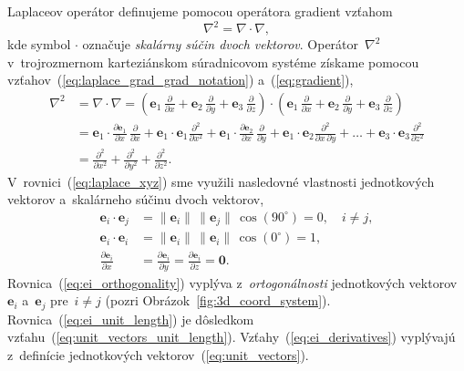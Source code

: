 \documentclass[a4paper, 12pt]{book}
\let\vec\mathbf
\begin{document}
Laplaceov operátor definujeme pomocou operátora gradient vzťahom
\parencite{SansoGeoidDetermination}
%
\begin{equation}
\label{eq:laplace_grad_grad_notation}
\nabla^2 = \nabla \cdot \nabla{,}
\end{equation}
%
kde symbol $\cdot$ označuje \emph{skalárny súčin dvoch vektorov}.  
Operátor~$\nabla^2$ v~trojrozmernom karteziánskom súradnicovom systéme získame 
pomocou vzťahov~(\ref{eq:laplace_grad_grad_notation}) a~(\ref{eq:gradient}),
%
\begin{equation}
\label{eq:laplace_xyz}
\begin{split}
\nabla^2 &= \nabla \cdot \nabla = \left( \vec e_1 \, \frac{\partial}{\partial 
x} + \vec e_2 \, \frac{\partial}{\partial y} + \vec e_3 \, 
\frac{\partial}{\partial z} \right) \cdot \left( \vec e_1 \, 
\frac{\partial}{\partial x} + \vec e_2 \, \frac{\partial}{\partial y} + \vec 
e_3 \, \frac{\partial}{\partial z} \right)\\
%
&=\vec e_1 \cdot \frac{\partial \vec e_1}{\partial x} \, 
\frac{\partial}{\partial x} + \vec e_1 \cdot \vec e_1 
\frac{\partial^2}{\partial x^2} + \vec e_1 \cdot \frac{\partial \vec 
e_2}{\partial x} \, \frac{\partial}{\partial y} + \vec e_1 \cdot \vec e_2 
\frac{\partial^2}{\partial x \, \partial y} + \dots + \vec e_3 \cdot \vec e_3 
\frac{\partial^2}{\partial z^2}\\
%
&=\frac{\partial^2}{\partial x^2} + \frac{\partial^2}{\partial y^2} 
+ \frac{\partial^2}{\partial z^2}{.}
\end{split}
\end{equation}
%
V~rovnici~(\ref{eq:laplace_xyz}) sme využili nasledovné vlastnosti 
jednotkových vektorov a~skalárneho súčinu dvoch vektorov,
%
\begin{align}
\label{eq:ei_orthogonality}
\vec e_i \cdot \vec e_j &= \| \vec e_i \| \, \| \vec e_j \| \, \cos(90^\circ) 
= 0{,} \quad i \neq j{,}\\
%
\label{eq:ei_unit_length}
\vec e_i \cdot \vec e_i &= \| \vec e_i \| \, \| \vec e_i \| \, \cos(0^\circ) 
= 1{,}\\
%
\label{eq:ei_derivatives}
\frac{\partial \vec e_i}{\partial x} &= \frac{\partial \vec e_i}{\partial y} 
= \frac{\partial \vec e_i}{\partial z} = \vec 0{.}
\end{align}
%
Rovnica~(\ref{eq:ei_orthogonality}) vyplýva z~\emph{ortogonálnosti} 
jednotkových vektorov~$\vec e_i$ a~$\vec e_j$ pre~$i \neq j$ (pozri 
Obrázok~\ref{fig:3d_coord_system}).  Rovnica~(\ref{eq:ei_unit_length}) je 
dôsledkom vzťahu~(\ref{eq:unit_vectors_unit_length}).  
Vzťahy~(\ref{eq:ei_derivatives}) vyplývajú z~definície jednotkových 
vektorov~(\ref{eq:unit_vectors}).
\end{document}
